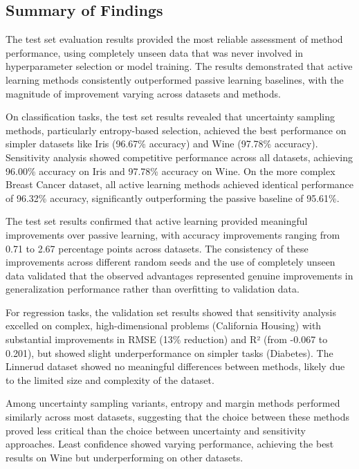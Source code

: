 \documentclass[conference]{IEEEtran}
\begin{document}
\subsection{Summary of Findings}

The test set evaluation results provided the most reliable assessment of method performance, using completely unseen data that was never involved in hyperparameter selection or model training. The results demonstrated that active learning methods consistently outperformed passive learning baselines, with the magnitude of improvement varying across datasets and methods.

On classification tasks, the test set results revealed that uncertainty sampling methods, particularly entropy-based selection, achieved the best performance on simpler datasets like Iris (96.67\% accuracy) and Wine (97.78\% accuracy). Sensitivity analysis showed competitive performance across all datasets, achieving 96.00\% accuracy on Iris and 97.78\% accuracy on Wine. On the more complex Breast Cancer dataset, all active learning methods achieved identical performance of 96.32\% accuracy, significantly outperforming the passive baseline of 95.61\%.

The test set results confirmed that active learning provided meaningful improvements over passive learning, with accuracy improvements ranging from 0.71 to 2.67 percentage points across datasets. The consistency of these improvements across different random seeds and the use of completely unseen data validated that the observed advantages represented genuine improvements in generalization performance rather than overfitting to validation data.

For regression tasks, the validation set results showed that sensitivity analysis excelled on complex, high-dimensional problems (California Housing) with substantial improvements in RMSE (13\% reduction) and R² (from -0.067 to 0.201), but showed slight underperformance on simpler tasks (Diabetes). The Linnerud dataset showed no meaningful differences between methods, likely due to the limited size and complexity of the dataset.

Among uncertainty sampling variants, entropy and margin methods performed similarly across most datasets, suggesting that the choice between these methods proved less critical than the choice between uncertainty and sensitivity approaches. Least confidence showed varying performance, achieving the best results on Wine but underperforming on other datasets.
\end{document}

